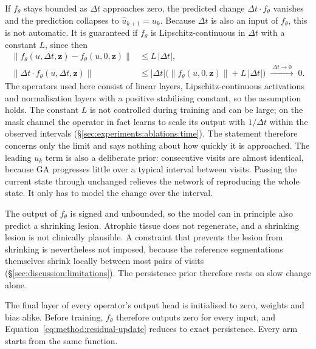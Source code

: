 If $f_\theta$ stays bounded as $\Delta t$ approaches zero, the predicted
change $\Delta t \cdot f_\theta$ vanishes and the prediction collapses to
$\hat u_{k+1} = u_k$. Because $\Delta t$ is also an input of $f_\theta$,
this is not automatic. It is guaranteed if $f_\theta$ is
Lipschitz-continuous in $\Delta t$ with a constant $L$, since then
\begin{align*}
  \lVert f_\theta(u, \Delta t, \mathbf{z}) - f_\theta(u, 0, \mathbf{z}) \rVert
  &\leq L \, |\Delta t| , \\
  \lVert \Delta t \cdot f_\theta(u, \Delta t, \mathbf{z}) \rVert
  &\leq |\Delta t| \bigl( \lVert f_\theta(u, 0, \mathbf{z}) \rVert
     + L \, |\Delta t| \bigr) \;\xrightarrow{\;\Delta t \to 0\;}\; 0 .
\end{align*}
The operators used here consist of linear layers,
Lipschitz-continuous activations and normalisation layers with a positive
stabilising constant, so the assumption holds. The constant $L$ is not
controlled during training and can be large; on the mask channel the
operator in fact learns to scale its output with $1/\Delta t$ within the
observed intervals (\S\ref{sec:experiments:ablations:time}). The statement
therefore concerns only the limit and says nothing about how quickly it is
approached. The
leading $u_k$ term is also a deliberate prior: consecutive visits are
almost identical, because GA progresses little over a typical interval
between visits. Passing the current state through unchanged relieves the
network of reproducing the whole state. It only has to model the change
over the interval.

The output of $f_\theta$ is signed and unbounded, so the model can in
principle also predict a shrinking lesion. Atrophic tissue does not
regenerate, and a shrinking lesion is not clinically plausible. A
constraint that prevents the lesion from shrinking is nevertheless not
imposed, because the reference
segmentations themselves shrink locally between most pairs of visits
(\S\ref{sec:discussion:limitations}). The persistence prior therefore rests
on slow change alone.

The final layer of every operator's output head is initialised to zero,
weights and bias alike. Before training, $f_\theta$ therefore outputs zero
for every input, and Equation~\eqref{eq:method:residual-update} reduces to
exact persistence. Every arm starts from the same function.

